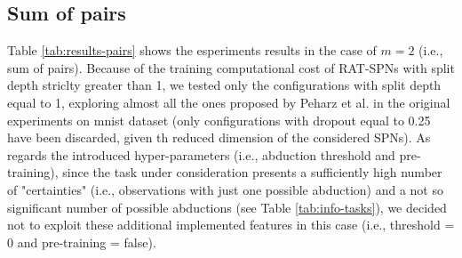 \subsection{Sum of pairs}
\label{results-pairs}
Table \ref{tab:results-pairs} shows the esperiments results in the case of $m=2$ (i.e., sum of pairs). Because of the training computational cost of RAT-SPNs with split depth striclty greater than 1, we tested only the configurations with split depth equal to 1, exploring almost all the ones proposed by Peharz et al. \cite{DBLP:journals/corr/abs-1806-01910} in the original experiments on mnist dataset (only configurations with dropout equal to 0.25 have been discarded, given th reduced dimension of the considered SPNs). As regards the introduced hyper-parameters (i.e., abduction threshold and pre-training), since the task under consideration presents a sufficiently high number of "certainties" (i.e., observations with just one possible abduction) and a not so significant number of possible abductions (see Table \ref{tab:info-tasks}), we decided not to exploit these additional implemented features in this case (i.e., threshold = 0 and pre-training = false).

